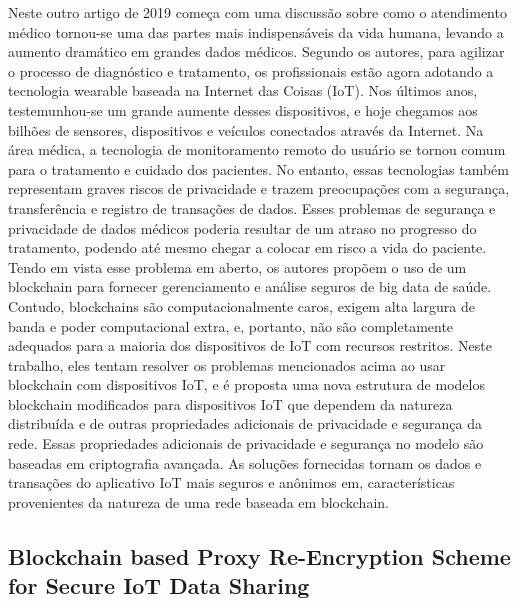     Neste outro artigo de 2019 \cite{dwivedi2019decentralized} começa com uma discussão sobre como o atendimento médico tornou-se uma das partes mais indispensáveis da vida humana, levando a aumento dramático em grandes dados médicos. Segundo os autores, para agilizar o processo de diagnóstico e tratamento, os profissionais estão agora adotando a tecnologia wearable baseada na Internet das Coisas (IoT). Nos últimos anos, testemunhou-se um grande aumente desses dispositivos, e hoje chegamos aos bilhões de sensores, dispositivos e veículos conectados através da Internet. Na área médica, a tecnologia de monitoramento remoto do usuário se tornou comum para o tratamento e cuidado dos pacientes. No entanto, essas tecnologias também representam graves riscos de privacidade e trazem preocupações com a segurança, transferência e registro de transações de dados. Esses problemas de segurança e privacidade de dados médicos poderia resultar de um atraso no progresso do tratamento, podendo até mesmo chegar a  colocar em risco a vida do paciente. Tendo em vista esse problema em aberto, os autores propõem o uso de um blockchain para fornecer gerenciamento e análise seguros de big data de saúde. Contudo, blockchains são computacionalmente caros, exigem alta largura de banda e poder computacional extra, e, portanto, não são completamente adequados para a maioria dos dispositivos de IoT com recursos restritos. Neste trabalho, eles tentam resolver os problemas mencionados acima ao usar blockchain com dispositivos IoT, e é proposta uma nova estrutura de modelos blockchain modificados para dispositivos IoT que dependem da natureza distribuída e de outras propriedades adicionais de privacidade e segurança da rede. Essas propriedades adicionais de privacidade e segurança no modelo são baseadas em criptografia avançada. As soluções fornecidas tornam os dados e transações do aplicativo IoT mais seguros e anônimos em, características provenientes da natureza de uma rede baseada em blockchain.
    
\subsection{Blockchain based Proxy Re-Encryption Scheme for Secure IoT Data Sharing}

